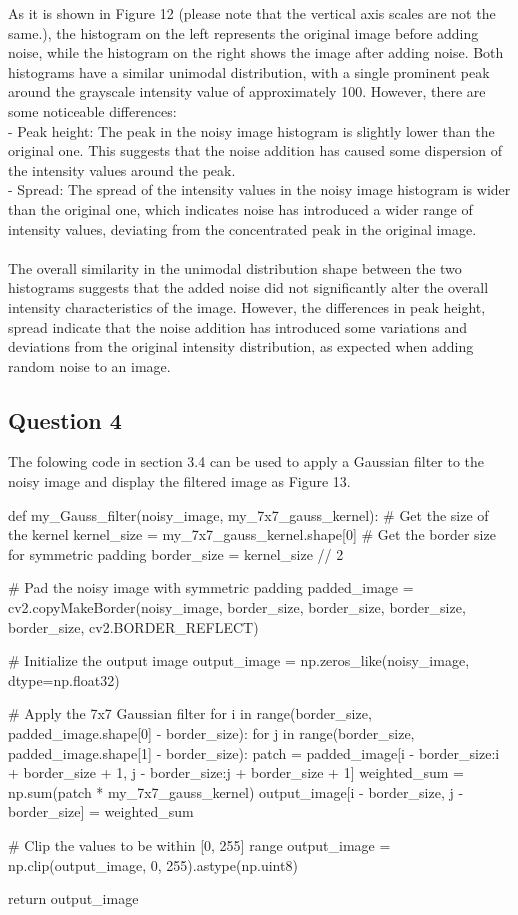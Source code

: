 \documentclass[12pt]{article}
\begin{document}
\quad As it is shown in Figure 12 (please note that the vertical axis scales are not the same.), the histogram on the left represents the original image before adding noise, while the histogram on the right shows the image after adding noise. Both histograms have a similar unimodal distribution, with a single prominent peak around the grayscale intensity value of approximately 100. However, there are some noticeable differences:\\
- Peak height: The peak in the noisy image histogram is slightly lower than the original one. This suggests that the noise addition has caused some dispersion of the intensity values around the peak.\\
- Spread: The spread of the intensity values in the noisy image histogram is wider than the original one, which indicates noise has introduced a wider range of intensity values, deviating from the concentrated peak in the original image.\\
\\
The overall similarity in the unimodal distribution shape between the two histograms suggests that the added noise did not significantly alter the overall intensity characteristics of the image. However, the differences in peak height, spread indicate that the noise addition has introduced some variations and deviations from the original intensity distribution, as expected when adding random noise to an image.
\subsection{Question 4}
\quad The folowing code in section 3.4 can be used to apply a Gaussian filter to the noisy image and display the filtered image as Figure 13.
\begin{python}
  def my_Gauss_filter(noisy_image, my_7x7_gauss_kernel):
    # Get the size of the kernel
    kernel_size = my_7x7_gauss_kernel.shape[0]
    # Get the border size for symmetric padding
    border_size = kernel_size // 2

    # Pad the noisy image with symmetric padding
    padded_image = cv2.copyMakeBorder(noisy_image, border_size, border_size, border_size, border_size, cv2.BORDER_REFLECT)

    # Initialize the output image
    output_image = np.zeros_like(noisy_image, dtype=np.float32)

    # Apply the 7x7 Gaussian filter
    for i in range(border_size, padded_image.shape[0] - border_size):
        for j in range(border_size, padded_image.shape[1] - border_size):
            patch = padded_image[i - border_size:i + border_size + 1, j - border_size:j + border_size + 1]
            weighted_sum = np.sum(patch * my_7x7_gauss_kernel)
            output_image[i - border_size, j - border_size] = weighted_sum

    # Clip the values to be within [0, 255] range
    output_image = np.clip(output_image, 0, 255).astype(np.uint8)

    return output_image
\end{python}
\end{document}
